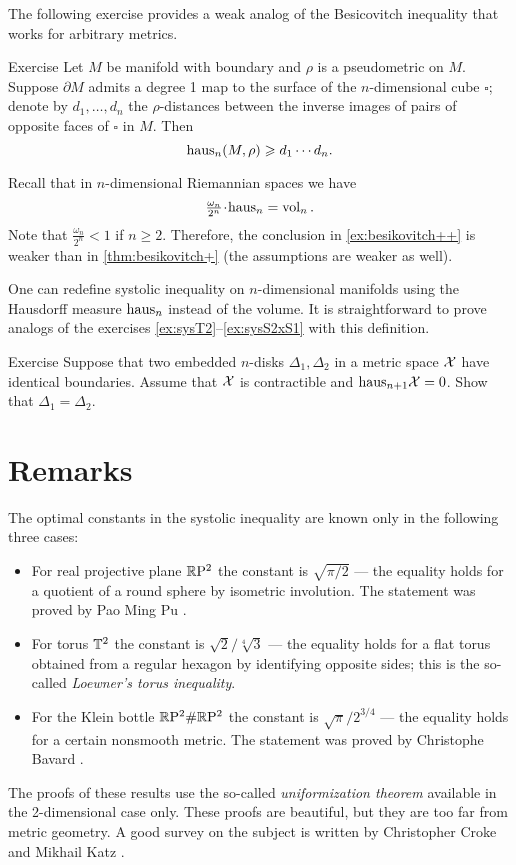 The following exercise provides a weak analog of the Besicovitch inequality that works for arbitrary metrics.

\begin{thm}{Exercise}\label{ex:besikovitch++}
Let $M$ be manifold with boundary and $\rho$ is a pseudometric on $M$.
Suppose $\partial M$ admits a degree 1 map to the surface of the $n$-dimensional cube $\square$;
denote by $d_1,\dots, d_n$ the $\rho$-distances between the inverse images of pairs of opposite faces of $\square$ in $M$.
Then 
\[\mathrm{haus}_n(M,\rho)\geqslant d_1\cdots d_n.\]
\end{thm}


Recall that in $n$-dimensional Riemannian spaces we have 
\[\tfrac{\omega_n}{2^n}\cdot\haus_n=\vol_n.\]
Note that $\tfrac{\omega_n}{2^n}<1$ if $n\ge 2$.
Therefore, the conclusion in \ref{ex:besikovitch++} is weaker than in \ref{thm:besikovitch+} (the assumptions are weaker as well).

One can redefine systolic inequality on $n$-dimensional manifolds using the Hausdorff measure $\mathrm{haus}_n$ instead of the volume.
It is straightforward to prove analogs of the exercises \ref{ex:sysT2}--\ref{ex:sysS2xS1} with this definition.

\begin{thm}{Exercise}\label{ex:2top-discs}
Suppose that two embedded $n$-disks $\Delta_1,\Delta_2$ in a metric space $\mathcal{X}$ have identical boundaries.
Assume that $\mathcal{X}$ is contractible and $\mathrm{haus}_{n+1}\mathcal{X}=0$.
Show that $\Delta_1=\Delta_2$.
\end{thm}

\section{Remarks}\label{sec:besicovitch-remarks}

The optimal constants in the systolic inequality are known only in the following three cases:
\begin{itemize}
\item For real projective plane $\mathbb{R}\mathrm{P}^2$ the constant is $\sqrt{\pi/2}$ --- the equality holds for a quotient of a round sphere by isometric involution. The statement was proved by Pao Ming Pu \cite{pu}.\label{page:pu}
\item For torus $\mathbb{T}^2$ the constant is $\sqrt{2}/\sqrt[4]{3}$ --- the equality holds for a flat torus obtained from a regular hexagon by identifying opposite sides; this is the so-called \emph{Loewner's torus inequality}.
\item For the Klein bottle $\mathbb{R}\mathrm{P}^2\#\mathbb{R}\mathrm{P}^2$  the constant is $\sqrt{\pi}/2^{3/4}$ --- the equality holds for a certain nonsmooth metric.
The statement was proved by Christophe Bavard \cite{bavard}.
\end{itemize}
The proofs of these results use the so-called {}\emph{uniformization theorem}   available in the 2-dimensional case only.
These proofs are beautiful, but they are too far from metric geometry.
A good survey on the subject is written by Christopher Croke and Mikhail Katz \cite{croke-katz}.

